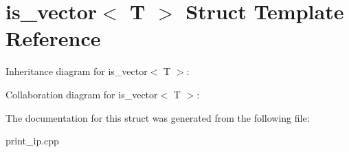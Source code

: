 \hypertarget{structis__vector}{}\section{is\+\_\+vector$<$ T $>$ Struct Template Reference}
\label{structis__vector}


Inheritance diagram for is\+\_\+vector$<$ T $>$\+:


Collaboration diagram for is\+\_\+vector$<$ T $>$\+:


The documentation for this struct was generated from the following file\+:\begin{DoxyCompactItemize}
\item 
print\+\_\+ip.\+cpp\end{DoxyCompactItemize}
